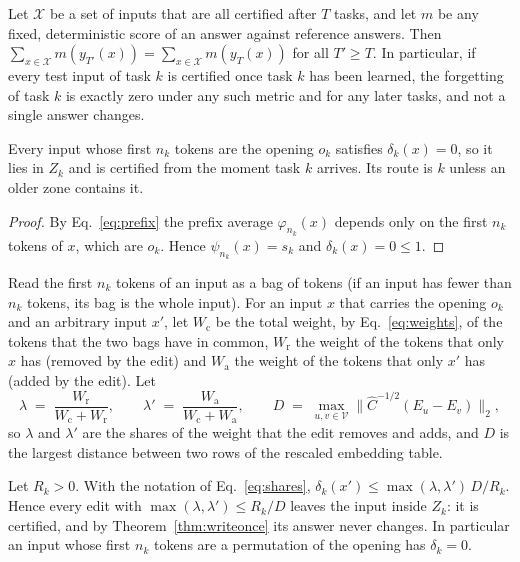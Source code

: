 \begin{corollary}
\label{cor:zero}
Let $\mathcal{X}$ be a set of inputs that are all certified after $T$ tasks, and let $m$ be any fixed, deterministic score of an
answer against reference answers. Then $\sum_{x \in \mathcal{X}} m(y_{T'}(x)) = \sum_{x \in \mathcal{X}} m(y_T(x))$ for all
$T' \ge T$. In particular, if every test input of task $k$ is certified once task $k$ has been
learned, the forgetting of task $k$ is exactly zero under any such metric and for any later tasks, and
not a single answer changes.
\end{corollary}

\begin{proposition}
\label{prop:own}
Every input whose first $n_k$ tokens are the opening $o_k$ satisfies $\delta_k(x) = 0$, so it lies in
$Z_k$ and is certified from the moment task $k$ arrives. Its route is $k$ unless an older
zone contains it.
\end{proposition}

\begin{proof}
By Eq.~\eqref{eq:prefix} the prefix average $\varphi_{n_k}(x)$ depends only on the first $n_k$ tokens
of $x$, which are $o_k$. Hence $\psi_{n_k}(x) = s_k$ and $\delta_k(x) = 0 \le 1$.
\end{proof}

Read the first $n_k$ tokens of an input as a bag
of tokens (if an input has fewer than $n_k$ tokens, its bag is the whole input). For an input $x$ that carries the opening $o_k$ and an arbitrary input $x'$, let $W_{\mathrm{c}}$ be
the total weight, by Eq.~\eqref{eq:weights}, of the tokens that the two bags have in common, $W_{\mathrm{r}}$
the weight of the tokens that only $x$ has (removed by the edit) and $W_{\mathrm{a}}$ the weight of the tokens
that only $x'$ has (added by the edit). Let
\begin{equation}
  \lambda \;=\; \frac{W_{\mathrm{r}}}{W_{\mathrm{c}} + W_{\mathrm{r}}}, \qquad \lambda' \;=\; \frac{W_{\mathrm{a}}}{W_{\mathrm{c}} + W_{\mathrm{a}}}, \qquad
  D \;=\; \max_{u, v \in \mathcal{V}} \bigl\lVert \hat{C}^{-1/2} (E_u - E_v) \bigr\rVert_2 ,
  \label{eq:shares}
\end{equation}
so $\lambda$ and $\lambda'$ are the shares of the weight that the edit removes and adds, and $D$ is
the largest distance between two rows of the rescaled embedding table.

\begin{proposition}
\label{prop:edits}
Let $R_k > 0$. With the notation of Eq.~\eqref{eq:shares}, $\delta_k(x') \le \max(\lambda, \lambda')\, D / R_k$.
Hence every edit with $\max(\lambda, \lambda') \le R_k / D$ leaves the input inside $Z_k$: it is
certified, and by Theorem~\ref{thm:writeonce} its answer never changes. In particular an input
whose first $n_k$ tokens are a permutation of the opening has $\delta_k = 0$.
\end{proposition}

